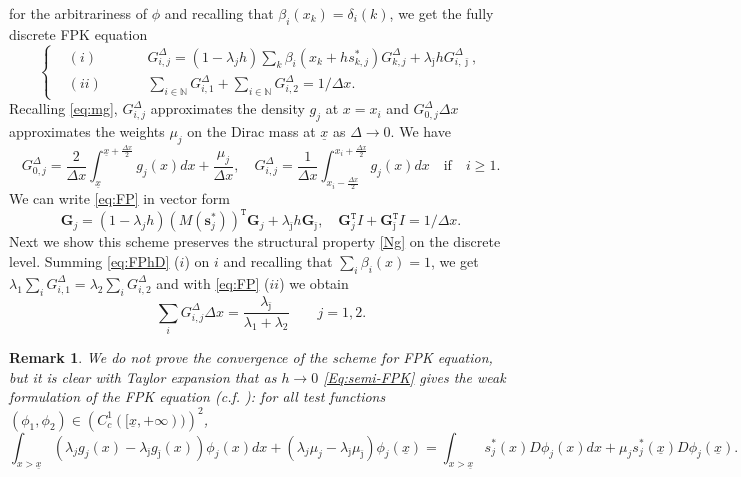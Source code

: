 \documentclass[11pt]{article}
\numberwithin{equation}{section}
\newtheorem{remark}[theorem]{Remark}
\theoremstyle{Claim}
\newcommand{\N}{\mathbb{N}}
\def\bG{{\mathbf{G}}}
\def\bjm{{\bar{\jmath}}}
\newcommand{\ux}{{\underline x}}
\theoremstyle{plain}
\newcommand{\D}{\Delta}
\begin{document}
for the arbitrariness of $\phi$ and recalling that $\beta_i(x_k)=\delta_i(k)$, we get the fully discrete FPK equation
\begin{equation}\label{eq:FP}
\left\{\begin{aligned}
&(i)\qquad &&	G^{\D}_{i,j}=(1-\lambda_jh)  \sum_k \beta_i\left(x_k+hs_{k,j}^*\right) G^{\D}_{k,j}    +\lambda_{\bar \jmath}hG^{\D}_{i,\bjm},\\
&(ii) &&	\sum_{i\in\N}G^{\D}_{i,1}+\sum_{i\in\N}G^{\D}_{i,2}=1/\D x.
	\end{aligned}\right.
\end{equation}
Recalling \cref{eq:mg}, $G^\D_{i,j}$ approximates the density $g_j$ at $x=x_i$ and $G^\D_{0,j}\D x$ approximates the weights $\mu_j$ on the Dirac mass at $\ux$ as $\D \to 0$. We have
$$
G^\D_{0,j}=\frac{2}{\D x}\int_{\ux}^{\ux+\frac{\D x}{2}}g_j(x)dx+\frac{\mu_j}{\D x},\quad G^\D_{i,j}=\frac{1}{\D x}\int_{x_i-\frac{\D x}{2}}^{x_i+\frac{\D x}{2}}g_j(x)dx\quad \text{if}\quad i\geq 1.
$$
We can write \cref{eq:FP} in vector form
\begin{equation}\label{eq:FP_vect}
	\bG_{j}=(1-\lambda_jh) \left(M(\mathbf{s}_j^*)\right)^{\texttt{T}}\bG_{j}    +\lambda_{\bar \jmath}h\bG_{\bjm},\quad \bG^{\texttt{T}}_{j}I+\bG^{\texttt{T}}_{\bjm}I=1/\D x.
\end{equation}
Next we show this scheme preserves the structural property \eqref{Ng} on the discrete level. Summing \eqref{eq:FPhD} ($i$) on $i$ and recalling that $\sum_i\beta_i(x)=1$, we get
$
\lambda_1\sum_i G^{\D}_{i,1}=\lambda_2\sum_i G^{\D}_{i,2}
$
and with \cref{eq:FP} ($ii$) we obtain
\begin{equation}\label{eq:cond_mass}
	\sum_i G^{\D}_{i,j}\D x=\frac{\lambda_{\bar \jmath}}{\lambda_1+\lambda_2} \qquad j=1,2.
\end{equation}

\begin{remark}
We do not prove the convergence of the scheme for FPK equation, but it is clear with Taylor expansion that as $h\to 0$ \cref{Eq:semi-FPK} gives the weak formulation of the FPK equation (c.f. \cite[Eq. (4.69), p. 296]{achdou2021mean}): for all test functions $(\phi_1,\phi_2)\in \left(C_c^1([\ux,+\infty))\right)^2$,
\begin{equation*}
\int_{x>\ux}\left(\lambda_j g_j(x)-\lambda_{\bar \jmath} g_{\bar \jmath}(x)\right)\phi_j(x)dx+(\lambda_j\mu_j-\lambda_{\bar \jmath}\mu_{\bar \jmath})\phi_j(\ux)
=\int_{x>\ux}s_j^*(x)D\phi_j(x)dx+\mu_js^*_j(\ux)D\phi_j(\ux).
\end{equation*}
\end{remark}
\end{document}
